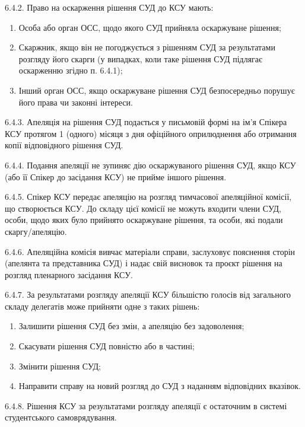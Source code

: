     6.4.2. Право на оскарження рішення СУД до КСУ мають:
        \begin{enumerate}[label=\alph*)]
            \item Особа або орган ОСС, щодо якого СУД прийняла оскаржуване рішення;
            \item Скаржник, якщо він не погоджується з рішенням СУД за результатами розгляду його скарги (у випадках, коли таке рішення СУД підлягає оскарженню згідно п. 6.4.1);
            \item Інший орган ОСС, якщо оскаржуване рішення СУД безпосередньо порушує його права чи законні інтереси.
        \end{enumerate}

    6.4.3. Апеляція на рішення СУД подається у письмовій формі на ім'я Спікера КСУ протягом 1 (одного) місяця з дня офіційного оприлюднення або отримання копії відповідного рішення СУД.

    6.4.4. Подання апеляції не зупиняє дію оскаржуваного рішення СУД, якщо КСУ (або її Спікер до засідання КСУ) не прийме іншого рішення.

    6.4.5. Спікер КСУ передає апеляцію на розгляд тимчасової апеляційної комісії, що створюється КСУ. До складу цієї комісії не можуть входити члени СУД, особи, щодо яких було прийнято оскаржуване рішення, та особи, які подали скаргу/апеляцію.

    6.4.6. Апеляційна комісія вивчає матеріали справи, заслуховує пояснення сторін (апелянта та представника СУД) і надає свій висновок та проєкт рішення на розгляд пленарного засідання КСУ.

    6.4.7. За результатами розгляду апеляції КСУ більшістю голосів від загального складу делегатів може прийняти одне з таких рішень:
        \begin{enumerate}[label=\alph*)]
            \item Залишити рішення СУД без змін, а апеляцію без задоволення;
            \item Скасувати рішення СУД повністю або в частині;
            \item Змінити рішення СУД;
            \item Направити справу на новий розгляд до СУД з наданням відповідних вказівок.
        \end{enumerate}
        
    6.4.8. Рішення КСУ за результатами розгляду апеляції є остаточним в системі студентського самоврядування. 